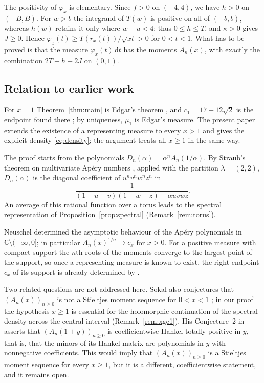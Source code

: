 \documentclass[11pt]{amsart}
\numberwithin{equation}{section}
\theoremstyle{definition}
\theoremstyle{remark}
\newcommand{\C}{\mathbb{C}}
\newcommand{\dd}{\,\mathrm{d}}
\begin{document}
The positivity of $\varphi_x$ is elementary. Since $f>0$ on $(-4,4)$, we
have $h>0$ on $(-B,B)$. For $w>b$ the integrand of $T(w)$ is positive on all
of $(-b,b)$, whereas $h(w)$ retains it only where $w-u<4$; thus $0\le h\le
T$, and $\kappa>0$ gives $J\ge0$. Hence $\varphi_x(t)\ge
T(r_x(t))/\sqrt{xt}>0$ for $0<t<1$. What has to be proved is that the
measure $\varphi_x(t)\dd t$ has the moments $A_n(x)$, with exactly the
combination $2T-h+2J$ on $(0,1)$.

\subsection*{Relation to earlier work}
For $x=1$ Theorem~\ref{thm:main} is Edgar's theorem \cite[Theorem~1]{Ed},
and $c_1=17+12\sqrt2$ is the endpoint found there \cite[Notation~3]{Ed}; by
uniqueness, $\mu_1$ is Edgar's measure. The present paper extends the
existence of a representing measure to every $x>1$ and gives the explicit
density \eqref{eq:density}; the argument treats all $x\ge1$ in the same way.

The proof starts from the polynomials $D_n(\alpha)=\alpha^nA_n(1/\alpha)$.
By Straub's theorem on multivariate Ap\'ery numbers \cite[Theorem~3.1]{St},
applied with the partition $\lambda=(2,2)$, $D_n(\alpha)$ is the diagonal
coefficient of $u^nv^nw^nz^n$ in
\[
\frac{1}{(1-u-v)(1-w-z)-\alpha uvwz}.
\]
An average of this rational function over a torus leads to the spectral
representation of Proposition~\ref{prop:spectral} (Remark~\ref{rem:torus}).

Neuschel \cite[Theorem~4.1]{Ne} determined the asymptotic behaviour of the
Ap\'ery polynomials in $\C\setminus(-\infty,0]$; in particular
$A_n(x)^{1/n}\to c_x$ for $x>0$. For a positive measure with compact support
the $n$th roots of the moments converge to the largest point of the support,
so once a representing measure is known to exist, the right endpoint $c_x$ of
its support is already determined by \cite{Ne}.

Two related questions are not addressed here. Sokal also conjectures that
$(A_n(x))_{n\ge0}$ is not a Stieltjes moment sequence for $0<x<1$
\cite[slide~29]{So25}; in our proof the hypothesis $x\ge1$ is essential for
the holomorphic continuation of the spectral density across the central
interval (Remark~\ref{rem:xge1}). His Conjecture~2 in \cite[slide~29]{So25}
asserts that $(A_n(1+y))_{n\ge0}$ is coefficientwise Hankel-totally positive
in $y$, that is, that the minors of its Hankel matrix are polynomials in $y$
with nonnegative coefficients. This would imply that $(A_n(x))_{n\ge0}$ is a
Stieltjes moment sequence for every $x\ge1$, but it is a different,
coefficientwise statement, and it remains open.
\end{document}
